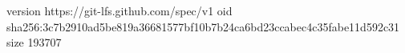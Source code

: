 version https://git-lfs.github.com/spec/v1
oid sha256:3c7b2910ad5be819a36681577bf10b7b24ca6bd23ccabec4c35fabe11d592c31
size 193707
